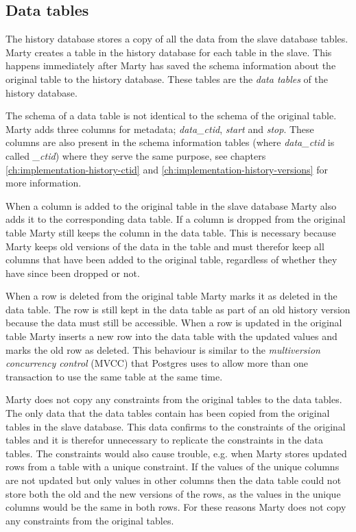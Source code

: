 \subsection{Data tables}
The history database stores a copy of all the data from the slave database tables.
Marty creates a table in the history database for each table in the slave.
This happens immediately after Marty has saved the schema information about the original table to the history database.
These tables are the \textit{data tables} of the history database.

The schema of a data table is not identical to the schema of the original table.
Marty adds three columns for metadata; \textit{data\_ctid}, \textit{start} and \textit{stop}.
These columns are also present in the schema information tables (where \textit{data\_ctid} is called \textit{\_ctid}) where they serve the same purpose, see chapters \ref{ch:implementation-history-ctid} and \ref{ch:implementation-history-versions} for more information.

When a column is added to the original table in the slave database Marty also adds it to the corresponding data table.
If a column is dropped from the original table Marty still keeps the column in the data table.
This is necessary because Marty keeps old versions of the data in the table and must therefor keep all columns that have been added to the original table, regardless of whether they have since been dropped or not.

When a row is deleted from the original table Marty marks it as deleted in the data table.
The row is still kept in the data table as part of an old history version because the data must still be accessible.
When a row is updated in the original table Marty inserts a new row into the data table with the updated values and marks the old row as deleted.
This behaviour is similar to the \textit{multiversion concurrency control} (MVCC) that Postgres uses to allow more than one transaction to use the same table at the same time.

Marty does not copy any constraints from the original tables to the data tables.
The only data that the data tables contain has been copied from the original tables in the slave database.
This data confirms to the constraints of the original tables and it is therefor unnecessary to replicate the constraints in the data tables.
The constraints would also cause trouble, e.g. when Marty stores updated rows from a table with a unique constraint.
If the values of the unique columns are not updated but only values in other columns then the data table could not store both the old and the new versions of the rows, as the values in the unique columns would be the same in both rows.
For these reasons Marty does not copy any constraints from the original tables.

